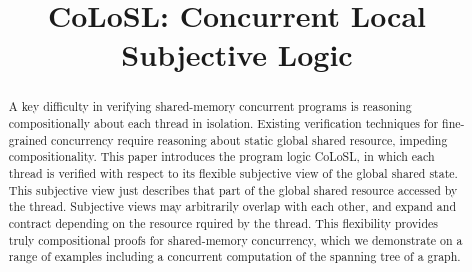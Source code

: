 \documentclass[preprint]{sigplanconf}
\begin{document}
\setlength{\pdfpageheight}{\paperheight}
\setlength{\pdfpagewidth}{\paperwidth}






\title{CoLoSL: Concurrent Local Subjective Logic}
\subtitle{}

\authorinfo\null\null\null

\maketitle

\begin{abstract}
A key difficulty in verifying shared-memory concurrent programs is
reasoning compositionally about each thread in isolation. Existing
verification techniques for fine-grained concurrency require 
reasoning about static global shared resource, impeding compositionality.  This
paper introduces the program logic CoLoSL, in which each thread is
verified with respect to its flexible subjective view of the global
shared state.
This subjective view  just describes  that part of the global shared resource accessed by the
thread. Subjective views may arbitrarily overlap with each other, and
expand and contract depending on the resource rquired by the thread.
This flexibility provides truly compositional proofs for shared-memory
concurrency, which we demonstrate on a range of examples including a
concurrent computation of the spanning tree of a graph.
\end{abstract}
\end{document}
